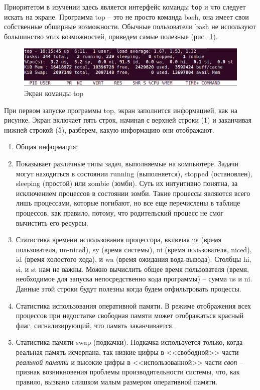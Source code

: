 \documentclass[a4paper,12pt,final,openany]{extbook}
\providecommand{\tightlist}{%
  \setlength{\itemsep}{0pt}\setlength{\parskip}{0pt}}
\begin{document}
Приоритетом в изучении здесь является интерфейс команды \texttt{top} и
что следует искать на экране. Программа top -- это не просто команда bash,
она имеет свои собственные обширные возможности. Обычные пользователи
bash не используют большинство этих возможностей, приведем самые
полезные (рис.~\ref{fig:topscreen}).
\begin{figure}[tbh]
  \centering
  \includegraphics[width=0.9\linewidth]{blog/2019/bash-essentials/top-header.png}

  \caption{Экран команды top}
  \label{fig:topscreen}
\end{figure}

При первом запуске программы top, экран заполнится информацией, как на рисунке. Экран включает пять строк, начиная с верхней строки (1) и
заканчивая нижней строкой (5), разберем, какую информацию они
отображают.
\begin{enumerate}
\tightlist
\item
  Общая информация;
\item
  Показывает различные типы задач, выполняемые на компьютере. Задачи
  могут находиться в состоянии running (выполняется), stopped
  (остановлен), sleeping (простой) или zombie (зомби). Суть их
  интуитивно понятна, за исключением процессов в состоянии зомби. Такие  процессы являются всего лишь процессами, которые погибают, но все еще
  перечислены в таблице процессов, как правило, потому, что родительский
  процесс не смог вычистить его ресурсы.
\item
  Статистика времени использования процессора, включая us (время
  пользователя, un-niced), sy (время системы), ni (время пользователя,
  niced), id (время холостого хода), и wa (время ожидания вода-вывода). Столбцы
  hi, si, и st нам не важны. Можно вычислить общее время пользователя
  (время, необходимое для запуска непосредственно кода программы) --
  сумма us и ni. Данные этой строки будут полезны когда будем
  отфильтровать процессы.
\item
  Статистика использования оперативной памяти. В режиме отображения всех
  процессов при недостатке свободная памяти может отображаться красный
  флаг, сигнализирующий, что память заканчивается.
\item
  Статистика памяти swap (подкачки). Подкачка используется только,
  когда реальная память исчерпана, так низкие цифры в <<свободной>> части
  \emph{реальной памяти} и высокие цифры в <<использованной>> части
  \emph{своп} -- признак возникновения проблемы производительности
  системы, что, как правило, вызвано слишком малым размером оперативной
  памяти.
\end{enumerate}
\end{document}

